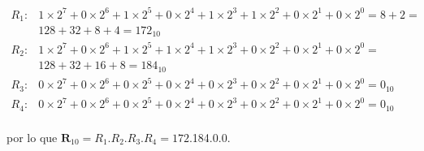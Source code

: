 \documentclass[stu, 12pt, letterpaper, donotrepeattitle, floatsintext, natbib]{apa7}
\begin{document}
\[\begin{matrix}
    R_1: & 1\times2^7+0\times2^6+1\times2^5+0\times2^4+1\times2^3+1\times2^2+0\times2^1+0\times2^0=8+2=\\
        & 128+32+8+4=172_{10}\\
    R_2: & 1\times2^7+0\times2^6+1\times2^5+1\times2^4+1\times2^3+0\times2^2+0\times2^1+0\times2^0=\\
        & 128+32+16+8=184_{10}\\
    R_3: & 0\times2^7+0\times2^6+0\times2^5+0\times2^4+0\times2^3+0\times2^2+0\times2^1+0\times2^0=0_{10}\\
    R_4: & 0\times2^7+0\times2^6+0\times2^5+0\times2^4+0\times2^3+0\times2^2+0\times2^1+0\times2^0=0_{10}\\     
\end{matrix}\]\par
por lo que $\textbf{R}_{10}=R_1$.$R_2$.$R_3$.$R_4=172$.184.0.0.
\end{document}
